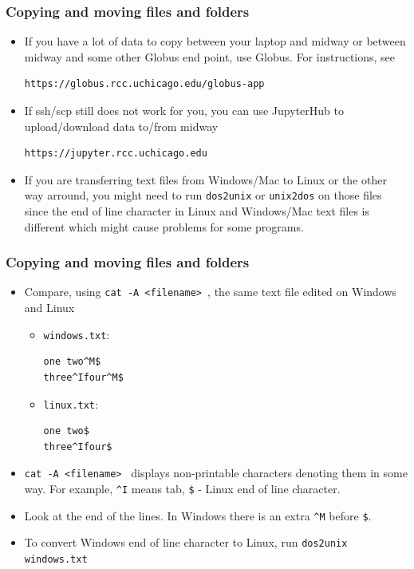 \documentclass{beamer}
\begin{document}
\begin{frame}[fragile]
  \frametitle{Copying and moving files and folders}
\begin{itemize}
\item If you have a lot of data to copy between your laptop and midway or between midway and some other Globus end point, use Globus. For instructions, see 
{\color{mycolorcli}
\begin{verbatim}
https://globus.rcc.uchicago.edu/globus-app
\end{verbatim}
}
\item If ssh/scp still does not work for you, you can use JupyterHub to upload/download data to/from midway
{\color{mycolorcli}
\begin{verbatim}
https://jupyter.rcc.uchicago.edu
\end{verbatim}
}
\item If you are transferring text files from Windows/Mac to Linux or the other way arround, you might need to run {\color{mycolorcli}\verb|dos2unix|} or {\color{mycolorcli}\verb|unix2dos|} on those files 
  since the end of line character in Linux and Windows/Mac text files is different which might cause problems for some programs. 
\end{itemize}
\end{frame}

\begin{frame}[fragile]
  \frametitle{Copying and moving files and folders}
\begin{itemize}
\item Compare,  using {\color{mycolorcli}\verb|cat -A <filename> |}, the same text file edited on Windows and Linux
  \begin{itemize}
  \item {\color{mycolorcli}\verb|windows.txt|}:
\begin{verbatim}
one two^M$
three^Ifour^M$
\end{verbatim}
  \item {\color{mycolorcli}\verb|linux.txt|}:
\begin{verbatim}
one two$
three^Ifour$
\end{verbatim}
  \end{itemize}
\item  {\color{mycolorcli}\verb|cat -A <filename> |} displays non-printable characters denoting them in some way. For example, {\color{mycolorcli}\verb|^I|} means tab, {\color{mycolorcli}\verb|$|} - Linux end of line character.
\item Look at the end of the lines. In Windows there is an extra \verb|^M| before \verb|$|.
\item To convert Windows end of line character to Linux, run {\color{mycolorcli}\verb|dos2unix windows.txt|}
\end{itemize}
\end{frame}
\end{document}
